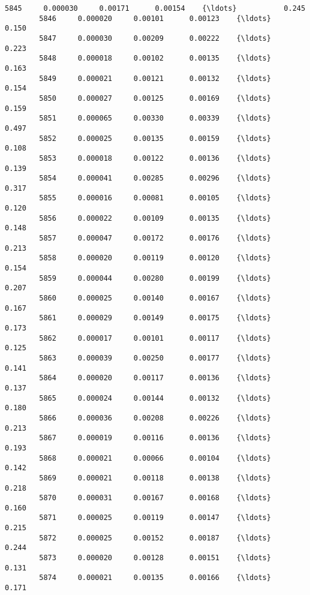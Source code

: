\documentclass[11pt]{article}
\begin{document}
\begin{Verbatim}[commandchars=\\\{\}]
        5845     0.000030     0.00171      0.00154    {\ldots}           0.245   
        5846     0.000020     0.00101      0.00123    {\ldots}           0.150   
        5847     0.000030     0.00209      0.00222    {\ldots}           0.223   
        5848     0.000018     0.00102      0.00135    {\ldots}           0.163   
        5849     0.000021     0.00121      0.00132    {\ldots}           0.154   
        5850     0.000027     0.00125      0.00169    {\ldots}           0.159   
        5851     0.000065     0.00330      0.00339    {\ldots}           0.497   
        5852     0.000025     0.00135      0.00159    {\ldots}           0.108   
        5853     0.000018     0.00122      0.00136    {\ldots}           0.139   
        5854     0.000041     0.00285      0.00296    {\ldots}           0.317   
        5855     0.000016     0.00081      0.00105    {\ldots}           0.120   
        5856     0.000022     0.00109      0.00135    {\ldots}           0.148   
        5857     0.000047     0.00172      0.00176    {\ldots}           0.213   
        5858     0.000020     0.00119      0.00120    {\ldots}           0.154   
        5859     0.000044     0.00280      0.00199    {\ldots}           0.207   
        5860     0.000025     0.00140      0.00167    {\ldots}           0.167   
        5861     0.000029     0.00149      0.00175    {\ldots}           0.173   
        5862     0.000017     0.00101      0.00117    {\ldots}           0.125   
        5863     0.000039     0.00250      0.00177    {\ldots}           0.141   
        5864     0.000020     0.00117      0.00136    {\ldots}           0.137   
        5865     0.000024     0.00144      0.00132    {\ldots}           0.180   
        5866     0.000036     0.00208      0.00226    {\ldots}           0.213   
        5867     0.000019     0.00116      0.00136    {\ldots}           0.193   
        5868     0.000021     0.00066      0.00104    {\ldots}           0.142   
        5869     0.000021     0.00118      0.00138    {\ldots}           0.218   
        5870     0.000031     0.00167      0.00168    {\ldots}           0.160   
        5871     0.000025     0.00119      0.00147    {\ldots}           0.215   
        5872     0.000025     0.00152      0.00187    {\ldots}           0.244   
        5873     0.000020     0.00128      0.00151    {\ldots}           0.131   
        5874     0.000021     0.00135      0.00166    {\ldots}           0.171   
        

\end{Verbatim}
\end{document}
